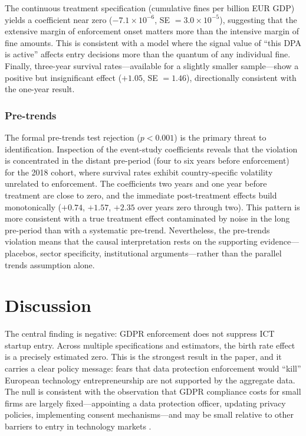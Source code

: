 \documentclass[12pt]{article}
\begin{document}
The continuous treatment specification (cumulative fines per billion EUR GDP) yields a coefficient near zero ($-7.1 \times 10^{-6}$, SE $= 3.0 \times 10^{-5}$), suggesting that the extensive margin of enforcement onset matters more than the intensive margin of fine amounts. This is consistent with a model where the signal value of ``this DPA is active'' affects entry decisions more than the quantum of any individual fine. Finally, three-year survival rates---available for a slightly smaller sample---show a positive but insignificant effect ($+1.05$, SE $= 1.46$), directionally consistent with the one-year result.

\subsubsection*{Pre-trends} The formal pre-trends test rejection ($p < 0.001$) is the primary threat to identification. Inspection of the event-study coefficients reveals that the violation is concentrated in the distant pre-period (four to six years before enforcement) for the 2018 cohort, where survival rates exhibit country-specific volatility unrelated to enforcement. The coefficients two years and one year before treatment are close to zero, and the immediate post-treatment effects build monotonically ($+0.74$, $+1.57$, $+2.35$ over years zero through two). This pattern is more consistent with a true treatment effect contaminated by noise in the long pre-period than with a systematic pre-trend. Nevertheless, the pre-trends violation means that the causal interpretation rests on the supporting evidence---placebos, sector specificity, institutional arguments---rather than the parallel trends assumption alone.

\section{Discussion}

The central finding is negative: GDPR enforcement does not suppress ICT startup entry. Across multiple specifications and estimators, the birth rate effect is a precisely estimated zero. This is the strongest result in the paper, and it carries a clear policy message: fears that data protection enforcement would ``kill'' European technology entrepreneurship are not supported by the aggregate data. The null is consistent with the observation that GDPR compliance costs for small firms are largely fixed---appointing a data protection officer, updating privacy policies, implementing consent mechanisms---and may be small relative to other barriers to entry in technology markets \citep{acquisti2016}.
\end{document}
